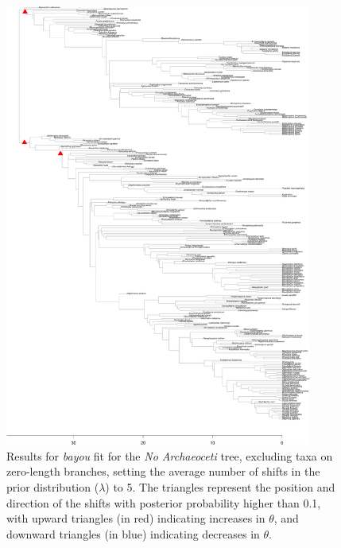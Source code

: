 \begin{figure}[H]
\includegraphics[width=0.9\textwidth]{img/plots-noarchaeo-k5-1.pdf}
\caption{Results for \textit{bayou} fit for the \textit{No Archaeoceti} tree, excluding taxa on zero-length branches, setting the average number of shifts in the prior distribution ($\lambda$) to 5. The triangles represent the position and direction of the shifts with posterior probability higher than 0.1, with upward triangles (in red) indicating increases in $\theta$, and downward triangles (in blue) indicating decreases in $\theta$.}
\label{fig:noarchaeo-k5-nzlb}
\end{figure}

\newpage

